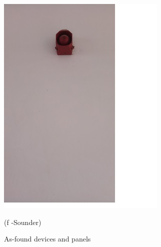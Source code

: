 \begin{figure}
\begin{minipage}[b]{0.2\linewidth}
		\includegraphics[width=\textwidth]{figures/R1P_fdas/sounder}
	\caption*{(f -Sounder)}
\end{minipage}
	\caption{As-found devices and panels}
	\label{ch04_fig_fdas01}
\end{figure}